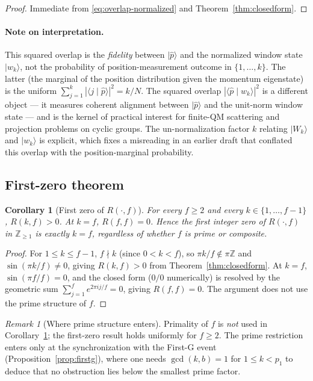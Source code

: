\documentclass[11pt,reqno]{amsart}
\theoremstyle{plain}
\newtheorem{corollary}[theorem]{Corollary}
\theoremstyle{definition}
\theoremstyle{remark}
\newtheorem*{remark}{Remark}
\newcommand{\Z}{\mathbb{Z}}
\begin{document}
\begin{proof}
Immediate from \eqref{eq:overlap-normalized} and Theorem~\ref{thm:closedform}.
\end{proof}

\paragraph{Note on interpretation.}
This squared overlap is the \emph{fidelity} between $|\hat p\rangle$ and the normalized
window state $|w_{k}\rangle$, not the probability of position-measurement outcome in
$\{1,\dots,k\}$. The latter (the marginal of the position distribution given the momentum
eigenstate) is the uniform $\sum_{j=1}^{k}|\langle j \mid \hat p\rangle|^{2} = k/N$.
The squared overlap $|\langle \hat p \mid w_{k}\rangle|^{2}$ is a different object --- it
measures coherent alignment between $|\hat p\rangle$ and the unit-norm window state ---
and is the kernel of practical interest for finite-QM scattering and projection problems
on cyclic groups. The un-normalization factor $k$ relating $|W_{k}\rangle$ and
$|w_{k}\rangle$ is explicit, which fixes a misreading in an earlier draft that conflated
this overlap with the position-marginal probability.

\subsection{First-zero theorem}

\begin{corollary}[First zero of $R(\cdot,f)$]
\label{cor:firstzero}
For every $f \ge 2$ and every $k \in \{1,\dots,f-1\}$, $R(k,f) > 0$. At $k = f$,
$R(f,f) = 0$. Hence the first integer zero of $R(\cdot,f)$ in $\Z_{\ge 1}$ is exactly
$k = f$, regardless of whether $f$ is prime or composite.
\end{corollary}

\begin{proof}
For $1 \le k \le f-1$, $f \nmid k$ (since $0 < k < f$), so
$\pi k/f \notin \pi\Z$ and $\sin(\pi k/f) \neq 0$, giving $R(k,f) > 0$ from
Theorem~\ref{thm:closedform}. At $k = f$, $\sin(\pi f/f) = 0$, and the closed form
($0/0$ numerically) is resolved by the geometric sum
$\sum_{j=1}^{f} e^{2\pi i j /f} = 0$, giving $R(f,f) = 0$. The argument does not use the
prime structure of $f$.
\end{proof}

\begin{remark}[Where prime structure enters]
Primality of $f$ is \emph{not} used in Corollary~\ref{cor:firstzero}; the first-zero
result holds uniformly for $f \ge 2$. The prime restriction enters only at the
synchronization with the First-G event (Proposition~\ref{prop:firstg}), where one needs
$\gcd(k,b) = 1$ for $1 \le k < p_{1}$ to deduce that no obstruction lies below the
smallest prime factor.
\end{remark}
\end{document}
